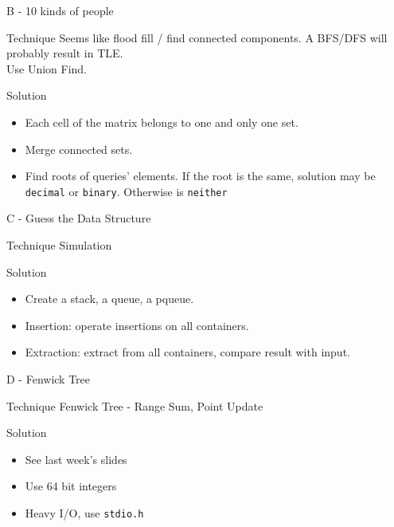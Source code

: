 \documentclass{beamer}
\begin{document}
  \begin{frame}{B - 10 kinds of people}
  \begin{block}{Technique}
  Seems like flood fill / find connected components. A BFS/DFS will probably result in TLE.\\
  Use Union Find.
  \end{block}
  
  \begin{block}{Solution}
  \begin{itemize}
  \item Each cell of the matrix belongs to one and only one set.
  \item Merge connected sets.
  \item Find roots of queries' elements. If the root is the same, solution may be \texttt{decimal} or \texttt{binary}. Otherwise is \texttt{neither}
  \end{itemize}
  \end{block}
  \end{frame}
  
  \begin{frame}{C - Guess the Data Structure}
  \begin{block}{Technique}
  Simulation
  \end{block}
  
  \begin{block}{Solution}
  \begin{itemize}
  \item Create a stack, a queue, a pqueue.
  \item Insertion: operate insertions on all containers.
  \item Extraction: extract from all containers, compare result with input.
  \end{itemize}
  \end{block}
  \end{frame}
  
  \begin{frame}{D - Fenwick Tree}
  \begin{block}{Technique}
  Fenwick Tree - Range Sum, Point Update
  \end{block}
  
  \begin{block}{Solution}
  \begin{itemize}
  \item See last week's slides
  \item Use 64 bit integers
  \item Heavy I/O, use \texttt{stdio.h}
  \end{itemize}
  \end{block}
  \end{frame}
  
\end{document}
